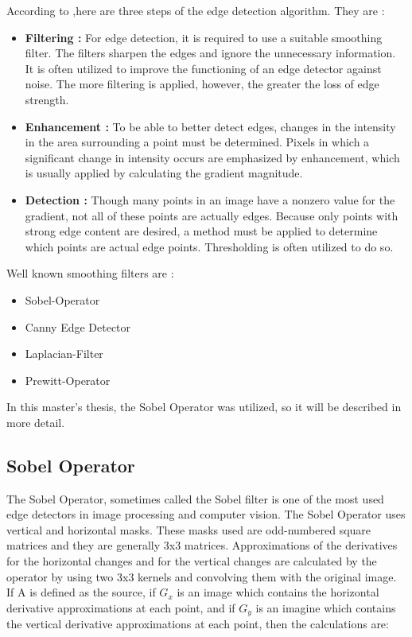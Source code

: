 According to \cite{Machine_Vision},here are three steps of the edge detection algorithm. They are :

\begin{itemize}

\item \textbf{Filtering : } For edge detection, it is required to use a suitable smoothing filter. The filters sharpen the edges and ignore the unnecessary information. It is often utilized to improve the functioning of an edge detector against noise. The more filtering is applied, however, the greater the loss of edge strength.
 
\item \textbf{Enhancement : } To be able to better detect edges, changes in the intensity in the area surrounding a point must be determined. Pixels in which a significant change in intensity occurs are emphasized by enhancement, which is usually applied by calculating the gradient magnitude.
  
\item \textbf{Detection : } Though many points in an image have a nonzero value for the gradient, not all of these points are actually edges. Because only points with strong edge content are desired, a method must be applied to determine which points are actual edge points. Thresholding is often utilized to do so.
 
\end{itemize}

Well known smoothing filters are :

\begin{itemize}

 \item Sobel-Operator
 \item Canny Edge Detector
 \item Laplacian-Filter
 \item Prewitt-Operator
 
 \end{itemize}
 
In this master's thesis, the Sobel Operator was utilized, so it will be described in more detail.

%
\subsection{Sobel Operator}\label{sec:Sobel Operator}

The Sobel Operator, sometimes called the Sobel filter is one of the most used edge detectors in image processing and computer vision. The Sobel Operator uses vertical and horizontal masks. These masks used are odd-numbered square matrices and they are generally 3x3 matrices. Approximations of the derivatives for the horizontal changes and for the vertical changes are calculated by the operator by using two 3x3 kernels and convolving them with the original image. If A is defined as the source, if $G_{x}$ is an image which contains the horizontal derivative approximations at each point, and if $G_{y}$ is an imagine which contains the vertical derivative approximations at each point, then the calculations are:


